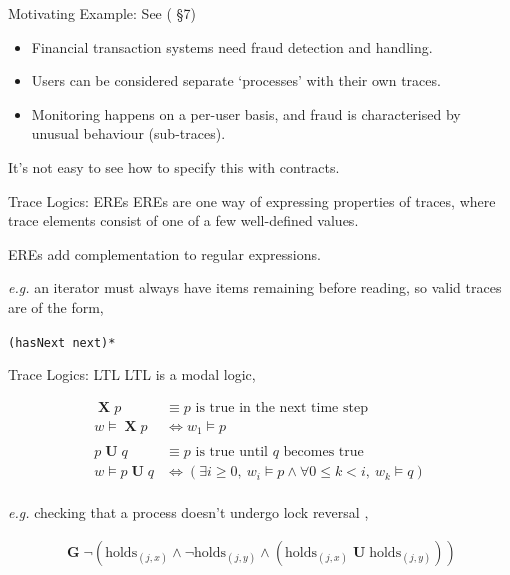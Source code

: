 \documentclass[12pt]{beamer}
\DeclareMathOperator{\lX}{\textbf{X}}
\DeclareMathOperator{\lU}{\textbf{U}}
\DeclareMathOperator{\lG}{\textbf{G}}
\newcommand{\holds}[2]{\mathrm{holds}_{\left(#1,#2\right)}}
\begin{document}
\begin{frame}{Motivating Example: \small See (\cite{compensate} \S7)}
  \begin{itemize}
    \item Financial transaction systems need fraud detection and
      handling.
    \item Users can be considered separate `processes' with their own
      traces.
    \item Monitoring happens on a per-user basis, and fraud is
      characterised by unusual behaviour (sub-traces).
  \end{itemize}

  It's not easy to see how to specify this with contracts.
\end{frame}

\begin{frame}{Trace Logics: \small EREs \parencite{eres}}
  EREs\footnotemark{} are one way of expressing properties of traces,
  where trace elements consist of one of a few well-defined values.

  \vspace{0.25cm}

  EREs add complementation to regular expressions.

  \vspace{0.25cm}

  \textit{e.g.} an iterator must always have items remaining before
  reading, so valid traces are of the form,

  \begin{center}
    \texttt{(hasNext next)*}
  \end{center}

\end{frame}

\begin{frame}{Trace Logics: \small LTL \parencite{ltl}}
  LTL\footnotemark{} is a modal logic,

  \begin{align*}
    \lX p &\equiv \mbox{$p$ is true in the next time step}\\
    w \models \lX p &\Leftrightarrow w_{1} \models p\\\\
    p \lU q &\equiv \mbox{$p$ is true until $q$ becomes true}\\
    w \models p \lU q &\Leftrightarrow \left(\exists i \geq 0,\ w_{i}
      \models p \land \forall 0 \leq k < i,\ w_{k}
      \models q\right)\\
  \end{align*}

  \textit{e.g.} checking that a process doesn't undergo lock
  reversal \parencite{hask},

  \begin{align*}
    \lG \lnot\left(\holds{j}{x} \land \lnot \holds{j}{y} \land
      \left(\holds{j}{x} \lU \holds{j}{y}\right)\right)\\
  \end{align*}

\end{frame}
\end{document}
